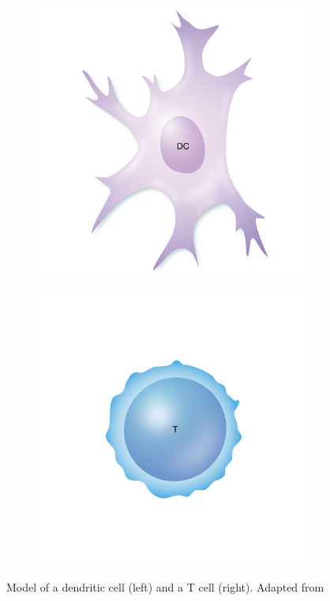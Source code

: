 \begin{figure}[h]
    \centering
    \begin{subfigure}[h!]{0.3\textwidth}
        \includegraphics[width=\textwidth]{dissertation/figures/model_DC.png}
    \end{subfigure}
    \begin{subfigure}[h!]{0.3\textwidth}
        \includegraphics[width=\textwidth]{dissertation/figures/model_Tcell.png}
    \end{subfigure}
    \caption{Model of a dendritic cell (left) and a T cell (right). Adapted from \cite{https://www.immunology.org/public-information/bitesized-immunology/systems-and-processes/t-cell-activation}}
    \label{eval:graphs}
\end{figure}

